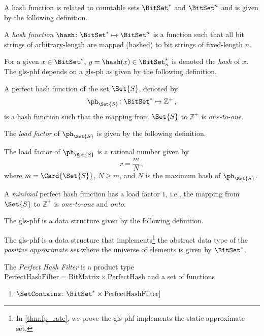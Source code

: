 \documentclass[ ../main.tex]{subfiles}
\begin{document}
A hash function is related to countable sets $\BitSet^*$ and $\BitSet^n$ and is given by the following definition.
\begin{definition}
A \emph{hash function} $\hash \colon \BitSet^* \mapsto \BitSet^n$ is a function such that all bit strings of arbitrary-length are mapped (hashed) to bit strings of fixed-length $n$.
\end{definition}
For a given $x \in \BitSet^*$, $y = \hash(x) \in \BitSet^*_n$ is denoted the \emph{hash} of $x$. The \gls{gls-phf} depends on a \gls{gls-ph} as given by the following definition.
\begin{definition}
A perfect hash function of the set $\Set{S}$, denoted by
\begin{equation}
    \ph_{\Set{S}} \colon \BitSet^* \mapsto \mathbb{Z}^{+}\,,
\end{equation}
is a hash function such that the mapping from $\Set{S}$ to $\mathbb{Z}^+$ is \emph{one-to-one}.
\end{definition}
The \emph{load factor} of $\ph_{\Set{S}}$ is given by the following definition.
\begin{definition}
\label{def:loadfactor}
The load factor of $\ph_{\Set{S}}$ is a rational number given by
\begin{equation}
\label{eq:loadfactor}
    r = \frac{m}{N}\,,
\end{equation}
where $m = \Card{\Set{S}}$, $N \geq m$, and $N$ is the maximum hash of $\ph_{\Set{S}}$.
\end{definition}
\begin{definition}
A \emph{minimal} perfect hash function has a load factor $1$, i.e., the mapping from $\Set{S}$ to $\mathbb{Z}^+$ is \emph{one-to-one} and \emph{onto}.
\end{definition}

The \gls{gls-phf} is a data structure given by the following definition.
\begin{definition}
The \gls{gls-phf} is a data structure that implements\footnote{In \cref{thm:fp_rate}, we prove the \gls{gls-phf} implements the static approximate set.} the abstract data type of the \emph{positive approximate set} where the universe of elements is given by $\BitSet^*$.
\end{definition}


The \emph{Perfect Hash Filter} is a product type $\textrm{PerfectHashFilter} = \textrm{BitMatrix} \times \textrm{PerfectHash}$ and a set of functions
\begin{enumerate}
\item $\SetContains \colon \BitSet^* \times \textrm{PerfectHashFilter}]$
\end{enumerate}
\end{document}
